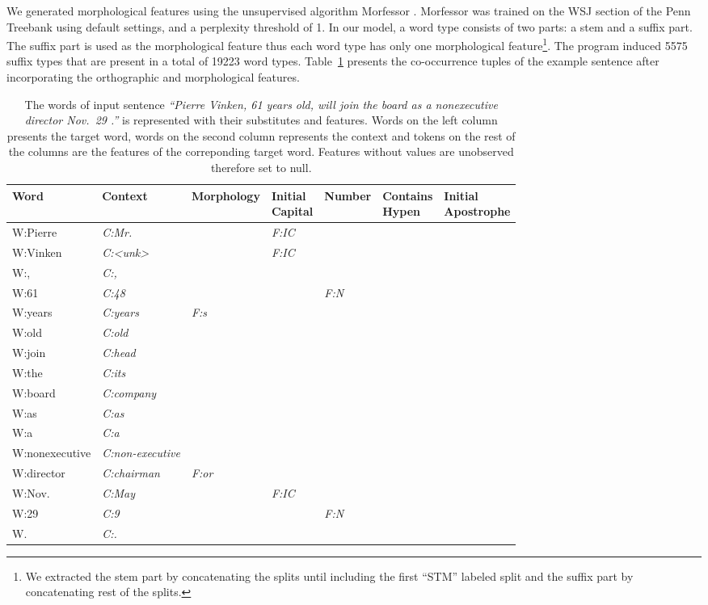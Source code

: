 We generated morphological features using the unsupervised algorithm
Morfessor \cite{creutz05}.  Morfessor was trained on the WSJ section
of the Penn Treebank using default settings, and a perplexity
threshold of 1.  In our model, a word type consists of two parts: a
stem and a suffix part.  The suffix part is used as the morphological
feature thus each word type has only one morphological
feature\footnote{We extracted the stem part by concatenating the
  splits until including the first ``STM'' labeled split and the
  suffix part by concatenating rest of the splits.}.  The program
induced 5575 suffix types that are present in a total of 19223 word
types.  Table~\ref{tab:sampleswithfeatures} presents the co-occurrence
tuples of the example sentence after incorporating the orthographic
and morphological features.
\begin{table}[ht]
\centering
\small
\caption{The words of input sentence \textit{``Pierre Vinken, 61 years old, 
    will join the board as a nonexecutive director Nov.~29 .''} is represented 
  with their substitutes and features.  Words on the left 
  column presents the
  target word, words on the second column represents the context and
  tokens on the rest of the columns are the features of the
  correponding target word.  Features without values are unobserved
  therefore set to null.}
\begin{tabular}{|lllllll|}
\hline
\textbf{Word} & {\bf Context} & {\bf Morphology} &
\specialcell{{\bf Initial}\\{\bf Capital}} & {\bf Number} &
\specialcell{{\bf Contains}\\{\bf Hypen}} &
\specialcell{{\bf Initial}\\{\bf Apostrophe}}
\\
\hline
W:Pierre & \textit{C:Mr.} & & {\it F:IC} &&&\\
W:Vinken & \textit{C:<unk>} & & {\it F:IC} &&&\\
W:, & \textit{C:,} & & &&&\\
W:61 & \textit{C:48} & & & {\it F:N}&&\\
W:years & \textit{C:years} & {\it F:s} &&&&\\
W:old & \textit{C:old} & & &&&\\
W:join & \textit{C:head} &&&&&\\
W:the & \textit{C:its} &&&&&\\
W:board & \textit{C:company} &&&&&\\
W:as & \textit{C:as} &&&&&\\
W:a & \textit{C:a} &&&&&\\
W:nonexecutive & \textit{C:non-executive} &&&&&\\
W:director & \textit{C:chairman} & {\it F:or}&&&&\\
W:Nov. & \textit{C:May} &&{\it F:IC}&&&\\
W:29 & \textit{C:9} &&&{\it F:N}&&\\
W. & \textit{C:.} & &&&&\\
\hline
\end{tabular}
\label{tab:sampleswithfeatures}
\end{table}

